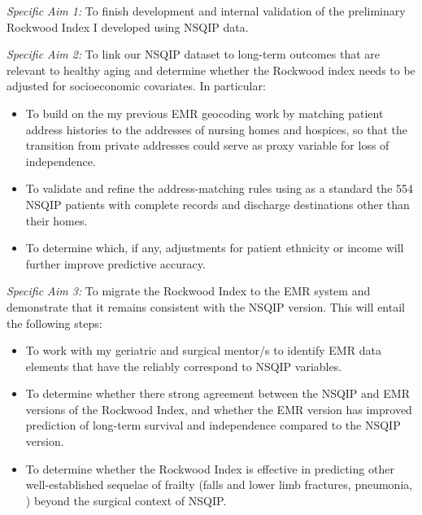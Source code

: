 \emph{Specific Aim 1:} To finish development and internal validation of the preliminary Rockwood Index I developed using NSQIP data.

\emph{Specific Aim 2:} To link our NSQIP dataset to long-term outcomes that are relevant to healthy aging and determine whether the Rockwood index needs to be adjusted for socioeconomic covariates. In particular:
\begin{itemize}
\item To build on the my previous EMR geocoding work by matching patient address histories to the addresses of nursing homes and hospices, so that the transition from private addresses could serve as  proxy variable for loss of independence.
\item To validate and refine the address-matching rules using as a standard the 554 NSQIP patients with complete records and discharge destinations other than their homes.
\item To determine which, if any, adjustments for patient ethnicity or income will further improve predictive accuracy.
\end{itemize}

\emph{Specific Aim 3:} To migrate the Rockwood Index to the EMR system and demonstrate that it remains consistent with the NSQIP version. This will entail the following steps:
\begin{itemize}
\item To work with my geriatric and surgical mentor/s to identify EMR data elements that have the reliably correspond to NSQIP variables.
\item To determine whether there strong agreement between the NSQIP and EMR versions of the Rockwood Index, and whether the EMR version has improved prediction of long-term survival and independence compared to the NSQIP version.
\item To determine whether the Rockwood Index is effective in predicting other well-established sequelae of frailty (falls and lower limb fractures, pneumonia, ) beyond the surgical context of NSQIP.
\end{itemize}


